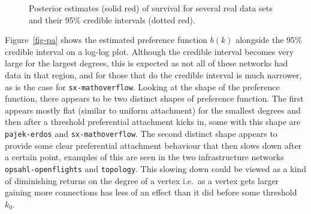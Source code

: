 \documentclass[
  sn-basic,
]{sn-jnl}
\theoremstyle{plain}
\theoremstyle{plain}
\theoremstyle{remark}
\begin{document}
\begin{figure}


\caption{\label{fig-shapes}Posterior estimates (solid red) of survival
for several real data sets and their 95\% credible intervals (dotted
red).}

\end{figure}%

Figure~\ref{fig-pa} shows the estimated preference function \(b(k)\)
alongside the 95\% credible interval on a log-log plot. Although the
credible interval becomes very large for the largest degrees, this is
expected as not all of these networks had data in that region, and for
those that do the credible interval is much narrower, as is the case for
\texttt{sx-mathoverflow}. Looking at the shape of the preference
function, there appears to be two distinct shapes of preference
function. The first appears mostly flat (similar to uniform attachment)
for the smallest degrees and then after a threshold preferential
attachment kicks in, some with this shape are \texttt{pajek-erdos} and
\texttt{sx-mathoverflow}. The second distinct shape appears to provide
some clear preferential attachment behaviour that then slows down after
a certain point, examples of this are seen in the two infrastructure
networks \texttt{opsahl-openflights} and \texttt{topology}. This slowing
down could be viewed as a kind of diminishing returns on the degree of a
vertex i.e.~as a vertex gets larger gaining more connections has less of
an effect than it did before some threshold \(k_0\).
\end{document}
